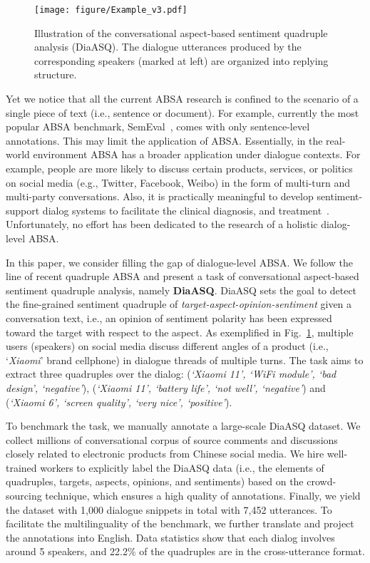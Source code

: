 \documentclass[11pt]{article}
\begin{document}
\begin{figure}[!t]
\vspace{10pt}
  \centering
  \texttt{[image: figure/Example\_v3.pdf]}
  \caption{
  Illustration of the conversational aspect-based sentiment quadruple analysis (DiaASQ).
  The dialogue utterances produced by the corresponding speakers (marked at left) are organized into replying structure.
  }
  \label{fig:example}
  \vspace{-11pt}
\end{figure}

Yet we notice that all the current ABSA research is confined to the scenario of a single piece of text (i.e., sentence or document).
For example, currently the most popular ABSA benchmark, SemEval~\cite{PontikiGPPAM14, PontikiGPMA15, PontikiGPAMAAZQ16}, comes with only sentence-level annotations.
This may limit the application of ABSA.
Essentially, in the real-world environment ABSA has a broader application under dialogue contexts.
For example, people are more likely to discuss certain products, services, or politics on social media (e.g., Twitter, Facebook, Weibo) in the form of multi-turn and multi-party conversations.
Also, it is practically meaningful to develop sentiment-support dialog systems to facilitate the clinical diagnosis, and treatment~\cite{liu-etal-2021-towards}.
Unfortunately, no effort has been dedicated to the research of a holistic dialog-level ABSA.

In this paper, we consider filling the gap of dialogue-level ABSA.
We follow the line of recent quadruple ABSA and present a task of conversational aspect-based sentiment quadruple analysis, namely \textbf{DiaASQ}.
DiaASQ sets the goal to detect the fine-grained sentiment quadruple of \emph{target-aspect-opinion-sentiment} given a conversation text, i.e., an opinion of sentiment polarity has been expressed toward the target with respect to the aspect.
As exemplified in Fig.~\ref{fig:example}, multiple users (speakers) on social media discuss different angles of a product (i.e., `\emph{Xiaomi}' brand cellphone) in dialogue threads of multiple turns. 
The task aims to extract three quadruples over the dialog: 
(\emph{`Xiaomi 11', `WiFi module', `bad design', `negative'}),
(\emph{`Xiaomi 11', `battery life', `not well', `negative'})
and (\emph{`Xiaomi 6', `screen quality', `very nice', `positive'}).

To benchmark the task, we manually annotate a large-scale DiaASQ dataset.
We collect millions of conversational corpus of source comments and discussions closely related to electronic products from Chinese social media.
We hire well-trained workers to explicitly label the DiaASQ data (i.e., the elements of quadruples, targets, aspects, opinions, and sentiments) based on the crowd-sourcing technique, which ensures a high quality of annotations.
Finally, we yield the dataset with 1,000 dialogue snippets in total with 7,452 utterances.
To facilitate the multilinguality of the benchmark, we further translate and project the annotations into English.
Data statistics show that each dialog involves around 5 speakers, and 22.2\% of the quadruples are in the cross-utterance format.
\end{document}
